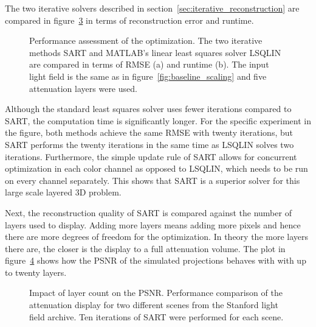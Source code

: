 The two iterative solvers described in section~\ref{sec:iterative_reconstruction} are compared in figure~\ref{fig:sart_vs_lsqlin} in terms of reconstruction error and runtime.
\begin{figure}[tb]
	\begin{subfigure}{0.5\textwidth}
		\centering
		
		\caption{}
		\label{fig:sart_lsqlin_iterations_vs_rmse}
	\end{subfigure}%
	\begin{subfigure}{0.5\textwidth}
		\centering
		
		\caption{}
		\label{fig:sart_lsqlin_iterations_vs_time}
	\end{subfigure}%
	\caption[Performance assessment of the optimization]
			{Performance assessment of the optimization.
			 The two iterative methods \mbox{SART} and \mbox{MATLAB's} linear least squares solver LSQLIN are compared in terms of \mbox{RMSE} (a) and runtime (b).
			 The input light field is the same as in figure~\ref{fig:baseline_scaling} and five attenuation layers were used.}
	\label{fig:sart_vs_lsqlin}
\end{figure}
Although the standard least squares solver uses fewer iterations compared to SART, the computation time is significantly longer.
For the specific experiment in the figure, both methods achieve the same RMSE with twenty iterations, but SART performs the twenty iterations in the same time as LSQLIN solves two iterations.
Furthermore, the simple update rule of SART allows for concurrent optimization in each color channel as opposed to LSQLIN, which needs to be run on every channel separately.
This shows that SART is a superior solver for this large scale layered 3D problem.

Next, the reconstruction quality of SART is compared against the number of layers used to display.
Adding more layers means adding more pixels and hence there are more degrees of freedom for the optimization.
In theory the more layers there are, the closer is the display to a full attenuation volume.
The plot in figure~\ref{fig:sart_layers_vs_psnr} shows how the PSNR of the simulated projections behaves with with up to twenty layers.
\begin{figure}[tb]
	\begin{subfigure}{\textwidth}
		\centering
		
	\end{subfigure}%
	\caption[Impact of layer count on \mbox{PSNR}]
			{Impact of layer count on the \mbox{PSNR}.
			 Performance comparison of the attenuation display for two different scenes from the Stanford light field archive.
			 Ten iterations of SART were performed for each scene.}
	\label{fig:sart_layers_vs_psnr}
\end{figure}

